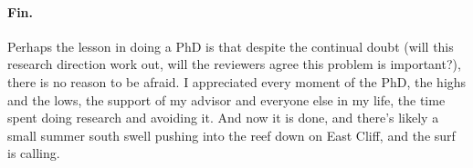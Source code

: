 \paragraph{Fin.} Perhaps the lesson in doing a PhD is that despite the continual doubt (will this research direction work out, will the reviewers agree this problem is important?), there is no reason to be afraid. I appreciated every moment of the PhD, the highs and the lows, the support of my advisor and everyone else in my life, the time spent doing research and avoiding it. And now it is done, and there's likely a small summer south swell pushing into the reef down on East Cliff, and the surf is calling.
